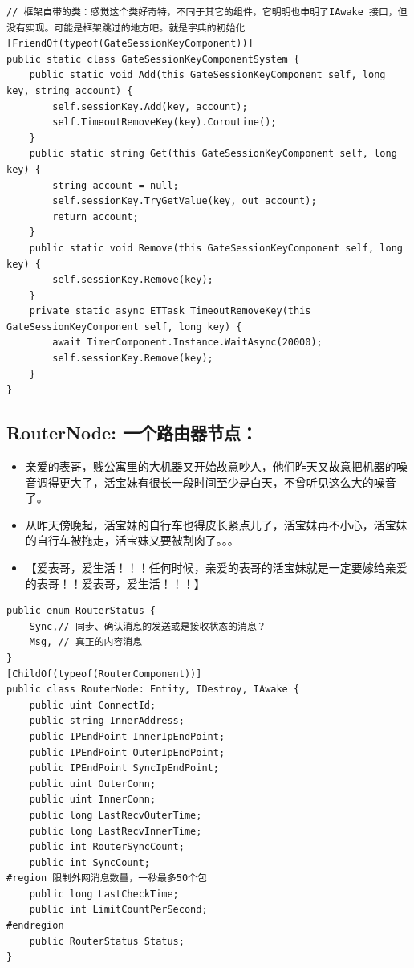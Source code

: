 \documentclass[9pt, b5paper]{article}
\begin{document}
\begin{verbatim}
// 框架自带的类：感觉这个类好奇特，不同于其它的组件，它明明也申明了IAwake 接口，但没有实现。可能是框架跳过的地方吧。就是字典的初始化
[FriendOf(typeof(GateSessionKeyComponent))]
public static class GateSessionKeyComponentSystem {
    public static void Add(this GateSessionKeyComponent self, long key, string account) {
        self.sessionKey.Add(key, account);
        self.TimeoutRemoveKey(key).Coroutine();
    }
    public static string Get(this GateSessionKeyComponent self, long key) {
        string account = null;
        self.sessionKey.TryGetValue(key, out account);
        return account;
    }
    public static void Remove(this GateSessionKeyComponent self, long key) {
        self.sessionKey.Remove(key);
    }
    private static async ETTask TimeoutRemoveKey(this GateSessionKeyComponent self, long key) {
        await TimerComponent.Instance.WaitAsync(20000);
        self.sessionKey.Remove(key);
    }
}
\end{verbatim}

\subsection{RouterNode: 一个路由器节点：}
\label{sec-7-26}
\begin{itemize}
\item 亲爱的表哥，贱公寓里的大机器又开始故意吵人，他们昨天又故意把机器的噪音调得更大了，活宝妹有很长一段时间至少是白天，不曾听见这么大的噪音了。
\item 从昨天傍晚起，活宝妹的自行车也得皮长紧点儿了，活宝妹再不小心，活宝妹的自行车被拖走，活宝妹又要被割肉了。。。
\item 【爱表哥，爱生活！！！任何时候，亲爱的表哥的活宝妹就是一定要嫁给亲爱的表哥！！爱表哥，爱生活！！！】
\end{itemize}
\begin{verbatim}
public enum RouterStatus {
    Sync,// 同步、确认消息的发送或是接收状态的消息？
    Msg, // 真正的内容消息
}
[ChildOf(typeof(RouterComponent))]
public class RouterNode: Entity, IDestroy, IAwake {
    public uint ConnectId;
    public string InnerAddress;
    public IPEndPoint InnerIpEndPoint;
    public IPEndPoint OuterIpEndPoint;
    public IPEndPoint SyncIpEndPoint;
    public uint OuterConn;
    public uint InnerConn;
    public long LastRecvOuterTime;
    public long LastRecvInnerTime;
    public int RouterSyncCount;
    public int SyncCount;
#region 限制外网消息数量，一秒最多50个包
    public long LastCheckTime;
    public int LimitCountPerSecond;
#endregion
    public RouterStatus Status;
}
\end{verbatim}
\end{document}
